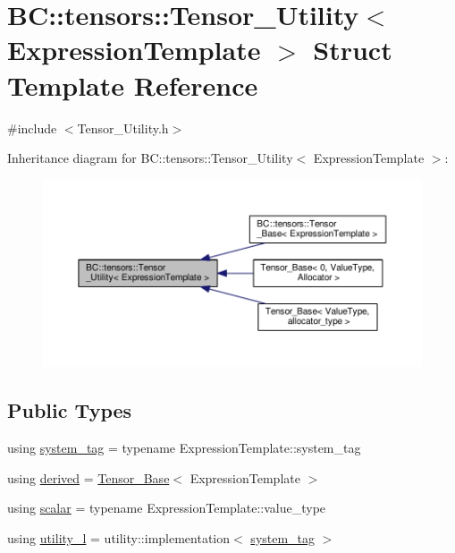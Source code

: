 \hypertarget{structBC_1_1tensors_1_1Tensor__Utility}{}\section{BC\+:\+:tensors\+:\+:Tensor\+\_\+\+Utility$<$ Expression\+Template $>$ Struct Template Reference}
\label{structBC_1_1tensors_1_1Tensor__Utility}


{\ttfamily \#include $<$Tensor\+\_\+\+Utility.\+h$>$}



Inheritance diagram for BC\+:\+:tensors\+:\+:Tensor\+\_\+\+Utility$<$ Expression\+Template $>$\+:
\nopagebreak
\begin{figure}[H]
\begin{center}
\leavevmode
\includegraphics[width=350pt]{structBC_1_1tensors_1_1Tensor__Utility__inherit__graph}
\end{center}
\end{figure}
\subsection*{Public Types}
\begin{DoxyCompactItemize}
\item 
using \hyperlink{structBC_1_1tensors_1_1Tensor__Utility_a6a3f28ec43165a64baf4e328029cf7a0}{system\+\_\+tag} = typename Expression\+Template\+::system\+\_\+tag
\item 
using \hyperlink{structBC_1_1tensors_1_1Tensor__Utility_a239565220d275ad807c9969dde8c775b}{derived} = \hyperlink{classBC_1_1tensors_1_1Tensor__Base}{Tensor\+\_\+\+Base}$<$ Expression\+Template $>$
\item 
using \hyperlink{structBC_1_1tensors_1_1Tensor__Utility_a77d35af590f103f5d512ade9bf2be6c9}{scalar} = typename Expression\+Template\+::value\+\_\+type
\item 
using \hyperlink{structBC_1_1tensors_1_1Tensor__Utility_ae309609d855fa2c7253d2c845473a3c0}{utility\+\_\+l} = utility\+::implementation$<$ \hyperlink{structBC_1_1tensors_1_1Tensor__Utility_a6a3f28ec43165a64baf4e328029cf7a0}{system\+\_\+tag} $>$
\end{DoxyCompactItemize}
